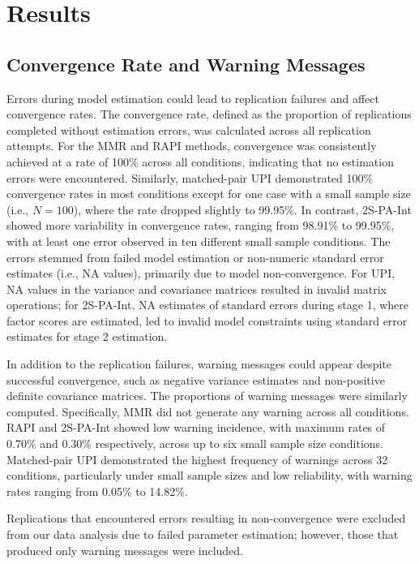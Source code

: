 \documentclass[
  man,mask]{apa6}
\begin{document}
\section{Results}\label{results}

\subsection{Convergence Rate and Warning Messages}\label{convergence-rate-and-warning-messages}

Errors during model estimation could lead to replication failures and affect convergence rates. The convergence rate, defined as the proportion of replications completed without estimation errors, was calculated across all replication attempts. For the MMR and RAPI methods, convergence was consistently achieved at a rate of 100\% across all conditions, indicating that no estimation errors were encountered. Similarly, matched-pair UPI demonstrated 100\% convergence rates in most conditions except for one case with a small sample size (i.e., \(\textit{N} = 100\)), where the rate dropped slightly to 99.95\%. In contrast, 2S-PA-Int showed more variability in convergence rates, ranging from 98.91\% to 99.95\%, with at least one error observed in ten different small sample conditions. The errors stemmed from failed model estimation or non-numeric standard error estimates (i.e., NA values), primarily due to model non-convergence. For UPI, NA values in the variance and covariance matrices resulted in invalid matrix operations; for 2S-PA-Int, NA estimates of standard errors during stage 1, where factor scores are estimated, led to invalid model constraints using standard error estimates for stage 2 estimation.

In addition to the replication failures, warning messages could appear despite successful convergence, such as negative variance estimates and non-positive definite covariance matrices. The proportions of warning messages were similarly computed. Specifically, MMR did not generate any warning across all conditions. RAPI and 2S-PA-Int showed low warning incidence, with maximum rates of 0.70\% and 0.30\% respectively, across up to six small sample size conditions. Matched-pair UPI demonstrated the highest frequency of warnings across 32 conditions, particularly under small sample sizes and low reliability, with warning rates ranging from 0.05\% to 14.82\%.

Replications that encountered errors resulting in non-convergence were excluded from our data analysis due to failed parameter estimation; however, those that produced only warning messages were included.
\end{document}
